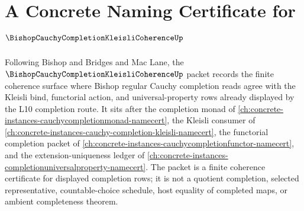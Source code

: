 \chapter{A Concrete Naming Certificate for $\BishopCauchyCompletionKleisliCoherenceUp$}
\label{ch:concrete-instances-bishop-cauchy-completion-kleisli-coherence-namecert}

Following Bishop and Bridges and Mac Lane, the $\BishopCauchyCompletionKleisliCoherenceUp$ packet records the finite coherence surface where Bishop regular Cauchy completion reads agree with the Kleisli bind, functorial action, and universal-property rows already displayed by the L10 completion route. It sits after the completion monad of \autoref{ch:concrete-instances-cauchycompletionmonad-namecert}, the Kleisli consumer of \autoref{ch:concrete-instances-cauchy-completion-kleisli-namecert}, the functorial completion packet of \autoref{ch:concrete-instances-cauchycompletionfunctor-namecert}, and the extension-uniqueness ledger of \autoref{ch:concrete-instances-completionuniversalproperty-namecert}. The packet is a finite coherence certificate for displayed completion rows; it is not a quotient completion, selected representative, countable-choice schedule, host equality of completed maps, or ambient completeness theorem.

